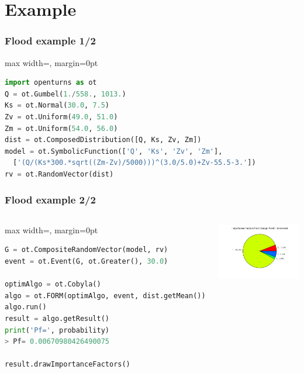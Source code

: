 \documentclass{beamer}
\begin{document}

\section{Example}

\begin{frame}[containsverbatim]
\frametitle{Flood example 1/2}
\begin{adjustbox}{max width=\linewidth, margin=0pt}
\begin{lstlisting}[language=Python,basicstyle=\ttfamily,keywordstyle=\color{red}]
import openturns as ot
Q = ot.Gumbel(1./558., 1013.)
Ks = ot.Normal(30.0, 7.5)
Zv = ot.Uniform(49.0, 51.0)
Zm = ot.Uniform(54.0, 56.0)
dist = ot.ComposedDistribution([Q, Ks, Zv, Zm])
model = ot.SymbolicFunction(['Q', 'Ks', 'Zv', 'Zm'],
  ['(Q/(Ks*300.*sqrt((Zm-Zv)/5000)))^(3.0/5.0)+Zv-55.5-3.'])
rv = ot.RandomVector(dist)
\end{lstlisting}
\end{adjustbox}
\end{frame}

\begin{frame}[containsverbatim]
\frametitle{Flood example 2/2}

  \begin{columns}

\begin{adjustbox}{max width=\linewidth, margin=0pt}
\begin{lstlisting}[language=Python,basicstyle=\ttfamily,keywordstyle=\color{red}]
G = ot.CompositeRandomVector(model, rv)
event = ot.Event(G, ot.Greater(), 30.0)

optimAlgo = ot.Cobyla()
algo = ot.FORM(optimAlgo, event, dist.getMean())
algo.run()
result = algo.getResult()
print('Pf=', probability)
> Pf= 0.00670980426490075

result.drawImportanceFactors()
\end{lstlisting}
\end{adjustbox}


\includegraphics[width=1.2\textwidth]{figures/imp_fact}

\end{columns}

\end{frame}
\end{document}
